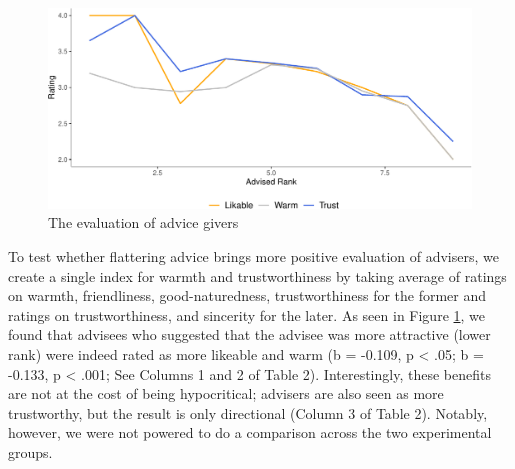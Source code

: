 \documentclass[
  man,floatsintext]{apa6}
\begin{document}
\begin{table}

\caption{\label{tab:study2regs}When individuals receive advice that implies a high level of attractiveness (lower rank), they tend to perceive the advice giver as more likable (Column 1), warm (Column 2). Column 3 shows that advisors are rated as more trustworthy when they advice lower ranks, but this relationship is only directional.}
\centering
{}
\end{table}

\begin{figure}

{\centering \includegraphics{Advice-Giving_files/figure-latex/study2rating-1} 

}

\caption{The evaluation of advice givers}\label{fig:study2rating}
\end{figure}

To test whether flattering advice brings more positive evaluation of advisers, we create a single index for warmth and trustworthiness by taking average of ratings on warmth, friendliness, good-naturedness, trustworthiness for the former and ratings on trustworthiness, and sincerity for the later. As seen in Figure \ref{fig:study2rating}, we found that advisees who suggested that the advisee was more attractive (lower rank) were indeed rated as more likeable and warm (b = -0.109, p \textless{} .05; b = -0.133, p \textless{} .001; See Columns 1 and 2 of Table 2). Interestingly, these benefits are not at the cost of being hypocritical; advisers are also seen as more trustworthy, but the result is only directional (Column 3 of Table 2). Notably, however, we were not powered to do a comparison across the two experimental groups.
\end{document}
